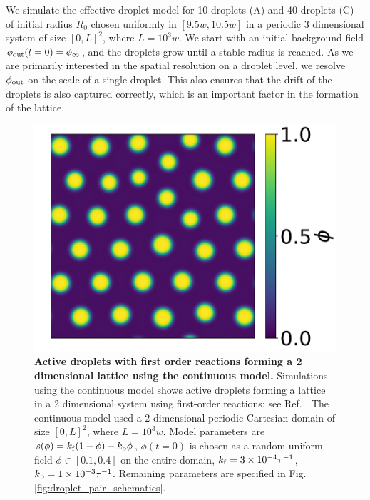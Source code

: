We simulate the effective droplet model for 10 droplets (A) and 40 droplets (C) of initial radius $R_0$ chosen uniformly in $[9.5w, 10.5w]$ in a periodic 3 dimensional system of size $[0, L]^2$, where $L = 10^3 w$.
We start with an initial background field $\phi_\mathrm{out}(t=0) = \phi_\infty$, and the droplets grow until a stable radius is reached.
As we are primarily interested in the spatial resolution on a droplet level, we resolve $\phi_\mathrm{out}$ on the scale of a single droplet.
This also ensures that the drift of the droplets is also captured correctly, which is an important factor in the formation of the lattice.

\begin{figure}[tb]
\centering
\includegraphics[scale=0.4]{MainContent/Figures/lattice_2D_CH.pdf}
\caption{\textbf{Active droplets with first order reactions forming a 2 dimensional lattice using the continuous model.}
Simulations using the continuous model shows active droplets forming a lattice in a 2 dimensional system using first-order reactions; see Ref. \cite{Zwicker2015}.
The continuous model used a $2$-dimensional periodic Cartesian domain of size $[0, L]^2$, where $L = 10^3 w$.
Model parameters are $s(\phi)= k_\mathrm{f} (1 - \phi) - k_\mathrm{b} \phi$, $\phi(t=0)$ is chosen as a random uniform field $\phi \in [0.1, 0.4]$ on the entire domain, $k_\mathrm{f} = 3 \times 10^{-4} \tau^{-1}$, $k_\mathrm{b} = 1 \times 10^{-3}  \tau^{-1}$.
Remaining parameters are specified in Fig. \ref{fig:droplet_pair_schematics}.
}
\label{fig:lattice_2D_CH}
\end{figure}

